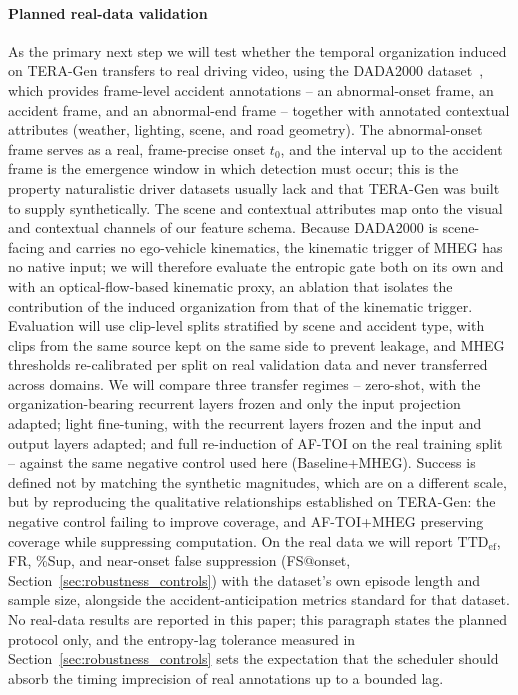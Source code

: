 \documentclass[a4paper,fleqn]{cas-dc}
\newcommand{\TERAGen}{\mbox{TERA-Gen}\xspace}
\newcommand{\AFTOI}{\mbox{AF-TOI}\xspace}
\newcommand{\MHEG}{\mbox{MHEG}\xspace}
\begin{document}
\paragraph{Planned real-data validation}
As the primary next step we will test whether the temporal organization induced
on \TERAGen transfers to real driving video, using the
DADA2000 dataset~\cite{fang2022dada}, which provides frame-level accident
annotations -- an abnormal-onset frame, an accident frame, and an abnormal-end
frame -- together with annotated contextual attributes (weather, lighting, scene,
and road geometry). The abnormal-onset frame serves as a real, frame-precise
onset $t_0$, and the interval up to the accident frame is the emergence window in
which detection must occur; this is the property naturalistic driver datasets
usually lack and that \TERAGen was built to supply synthetically. The scene and
contextual attributes map onto the visual and contextual channels of our feature
schema. Because DADA2000 is scene-facing and carries no ego-vehicle kinematics,
the kinematic trigger of \MHEG has no native input; we will therefore evaluate the
entropic gate both on its own and with an optical-flow-based kinematic proxy, an
ablation that isolates the contribution of the induced organization from that of
the kinematic trigger. Evaluation will use clip-level splits stratified by scene and
accident type, with clips from the same source kept on the same side to prevent
leakage, and \MHEG thresholds re-calibrated per split on real validation data and
never transferred across domains. We will compare three transfer regimes --
zero-shot, with the organization-bearing recurrent layers frozen and only the
input projection adapted; light fine-tuning, with the recurrent layers frozen and
the input and output layers adapted; and full re-induction of \AFTOI on the real
training split -- against the same negative control used here (Baseline+MHEG).
Success is defined not by matching the synthetic magnitudes, which are on a
different scale, but by reproducing the qualitative relationships established on
\TERAGen: the negative control failing to improve coverage, and \mbox{AF-TOI}+MHEG
preserving coverage while suppressing computation. On the real data we will report
$\mathrm{TTD}_{\mathrm{ef}}$, FR, \%Sup, and near-onset false suppression
(FS@onset, Section~\ref{sec:robustness_controls}) with the dataset's own episode
length and sample size, alongside the accident-anticipation metrics standard for
that dataset. No real-data results are reported in this paper; this paragraph
states the planned protocol only, and the entropy-lag tolerance measured in
Section~\ref{sec:robustness_controls} sets the expectation that the scheduler
should absorb the timing imprecision of real annotations up to a bounded lag.
\end{document}

